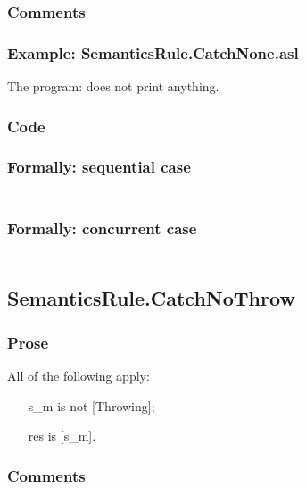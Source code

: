 \documentclass{book}
\begin{document}
    \subsubsection{Comments}

    \subsubsection{Example: SemanticsRule.CatchNone.asl}
    The program:
    does not print anything.

  \subsubsection{Code}

  \subsubsection{Formally: sequential case}
  \begin{align}
  \end{align} 

  \subsubsection{Formally: concurrent case}
  \begin{align}
  \end{align} 

\subsection{SemanticsRule.CatchNoThrow \label{sec:SemanticsRule.CatchNoThrow}}

    \subsubsection{Prose}
    All of the following apply:
    \begin{itemize}
    \item [s\_m] is not [Throwing];
    \item [res] is [s\_m].
    \end{itemize}

    \subsubsection{Comments}
\end{document}
